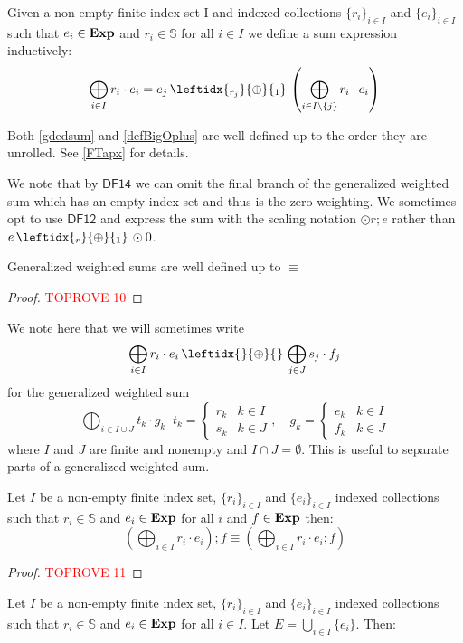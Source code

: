 \documentclass[a4paper,UKenglish,cleveref, autoref, thm-restate]{lipics-v2021}
\newcommand{\Exp}{\textbf{\upshape{Exp}}}
\newcommand{\WC}[2]{\,\leftidx{_{#1}}{{\oplus}}{_{#2}}\,}
\newcommand{\Ax}[1]{\ensuremath{\mathsf{#1}}}
\theoremstyle{plain}\newtheoremrep{thm}{Theorem}[section]
\begin{document}
		\begin{defn} 
			\label{defBigOplus}
			Given a non-empty finite index set I and indexed collections $\{r_i\}_{i\in I}$ and $\{e_i\}_{i\in I}$ such that $e_i \in \Exp$ and $r_i \in \mathbb S$ for all $i\in I$ we define a sum  expression inductively:
			$$\bigoplus_{i\in I}r_i \cdot e_i = e_j \WC{r_j}{1} \left( \bigoplus_{i\in I\setminus\{j\}}r_i\cdot e_i \right)$$
		\end{defn}
		Both \cref{gdedsum} and \cref{defBigOplus} are well defined up to the order they are unrolled. See \cref{FTapx} for details.
	\begin{toappendix}
		
		We note that by \Ax{DF14} we can omit the final branch of the generalized weighted sum which has an empty index set and thus is the zero weighting. We sometimes opt to use \Ax{DF12} and express the sum with the scaling notation $\odot r;e$ rather than $e \WC{r}{1} \odot 0$.
		
		\begin{lem}
			Generalized weighted sums are well defined up to $\equiv$ \label{lem59} 
		\end{lem}
		\begin{proof}\textcolor{red}{TOPROVE 10}\end{proof}
		\begin{rem}
		We note here that we will sometimes write $$\bigoplus_{i \in I} r_i\cdot e_i \WC{}{} \bigoplus_{j \in J} s_j\cdot f_j$$ for the generalized weighted sum $$\bigoplus_{i \in I\cup J}t_k\cdot g_k \;\; t_k = \begin{cases}
			r_k & k \in I\\ s_k & k \in J 
		\end{cases},\quad g_k = \begin{cases}
		e_k & k \in I\\ f_k & k \in J
		\end{cases}$$ where $I$ and $J$ are finite and nonempty and $I \cap J = \emptyset$. This is useful to separate parts of a generalized weighted sum.
		\end{rem}
		\begin{lem}
			Let $I$ be a non-empty finite index set, $\{r_i\}_{i\in I}$ and $\{e_i\}_{i\in I}$ indexed collections such that $r_i \in \mathbb S$ and $e_i \in \Exp$ for all $i$ and $f \in \Exp$ then:
			$$\left(\bigoplus_{i\in I}r_i\cdot e_i\right);f \equiv \left(\bigoplus_{i\in I}r_i\cdot e_i;f\right)$$ \label{lem61}
		\end{lem}
		\begin{proof}\textcolor{red}{TOPROVE 11}\end{proof}
		\begin{lem}
			Let $I$ be a non-empty finite index set, $\{r_i\}_{i\in I}$ and $\{e_i\}_{i\in I}$ indexed collections such that $r_i \in \mathbb S$ and $e_i \in \Exp$ for all $i\in I$. Let $E = \bigcup_{i \in I}\{e_i\}$. Then: 
			

\end{lem}
\end{toappendix}
\end{document}
